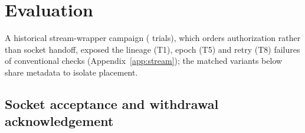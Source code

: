 \section{Evaluation}
\label{sec:eval}


A historical stream-wrapper campaign (\nTrialsValid{} trials), which orders authorization rather than socket handoff,
exposed the lineage (T1), epoch (T5) and retry (T8) failures of conventional checks (Appendix~\ref{app:stream}); the
matched variants below share metadata to isolate placement.

\subsection{Socket acceptance and withdrawal acknowledgement}
\label{sec:revision}





